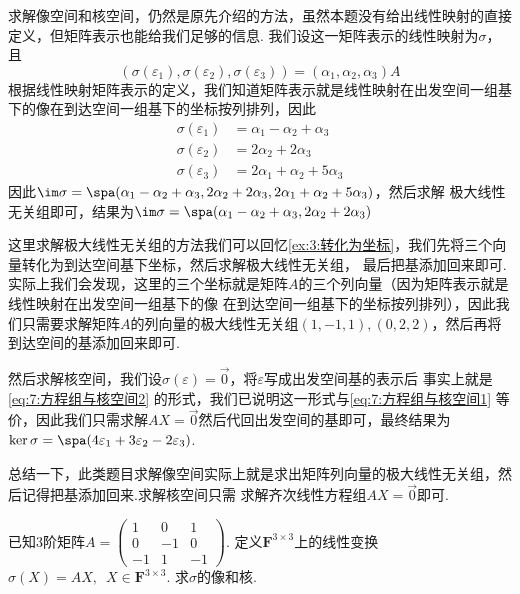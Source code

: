 \begin{solution}
求解像空间和核空间，仍然是原先介绍的方法，虽然本题没有给出线性映射的直接定义，但矩阵表示也能给我们足够的信息.
我们设这一矩阵表示的线性映射为$\sigma$，且
\[(\sigma(\varepsilon_1),\sigma(\varepsilon_2),\sigma(\varepsilon_3))=(\alpha_1,\alpha_2,\alpha_3)A\]
根据线性映射矩阵表示的定义，我们知道矩阵表示就是线性映射在出发空间一组基下的像在到达空间一组基下的坐标按列排列，因此
\begin{align*}
    \sigma(\varepsilon_1)&=\alpha_1-\alpha_2+\alpha_3 \\
    \sigma(\varepsilon_2)&=2\alpha_2+2\alpha_3 \\
    \sigma(\varepsilon_3)&=2\alpha_1+\alpha_2+5\alpha_3
\end{align*}
因此$\im\sigma=\spa(\alpha_1-\alpha_2+\alpha_3,2\alpha_2+2\alpha_3,2\alpha_1+\alpha_2+5\alpha_3)$，然后求解
极大线性无关组即可，结果为$\im\sigma=\spa(\alpha_1-\alpha_2+\alpha_3,2\alpha_2+2\alpha_3)$

这里求解极大线性无关组的方法我们可以回忆\autoref{ex:3:转化为坐标}，我们先将三个向量转化为到达空间基下坐标，然后求解极大线性无关组，
最后把基添加回来即可.实际上我们会发现，这里的三个坐标就是矩阵$A$的三个列向量（因为矩阵表示就是线性映射在出发空间一组基下的像
在到达空间一组基下的坐标按列排列），因此我们只需要求解矩阵$A$的列向量的极大线性无关组$(1,-1,1),(0,2,2)$，然后再将到达空间的基添加回来即可.

然后求解核空间，我们设$\sigma(\varepsilon)=\vec{0}$，将$\varepsilon$写成出发空间基的表示后
事实上就是\autoref{eq:7:方程组与核空间2} 的形式，我们已说明这一形式与\autoref{eq:7:方程组与核空间1}
等价，因此我们只需求解$AX=\vec{0}$然后代回出发空间的基即可，最终结果为
$\ker\sigma=\spa(4\varepsilon_1+3\varepsilon_2-2\varepsilon_3)$.
\end{solution}

总结一下，此类题目求解像空间实际上就是求出矩阵列向量的极大线性无关组，然后记得把基添加回来.求解核空间只需
求解齐次线性方程组$AX=\vec{0}$即可.

\begin{example}\label{ex:7:矩阵表示3}
    已知3阶矩阵$A=\begin{pmatrix}
        1 & 0 & 1 \\ 0 & -1 & 0 \\ -1 & 1 & -1
    \end{pmatrix}$. 定义$\mathbf{F}^{3 \times 3}$上的线性变换$\sigma(X)=AX,\enspace X \in \mathbf{F}^{3 \times 3}$.
    求$\sigma$的像和核.
\end{example}
\begin{solution}

\end{solution}

